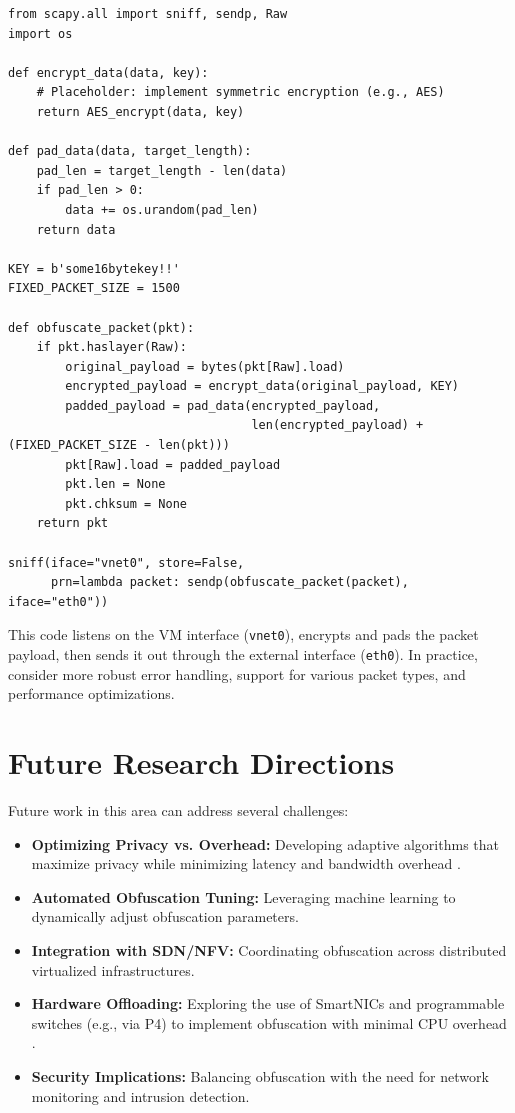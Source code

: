 \documentclass{article}
\begin{document}
\begin{verbatim}
from scapy.all import sniff, sendp, Raw
import os

def encrypt_data(data, key):
    # Placeholder: implement symmetric encryption (e.g., AES)
    return AES_encrypt(data, key)

def pad_data(data, target_length):
    pad_len = target_length - len(data)
    if pad_len > 0:
        data += os.urandom(pad_len)
    return data

KEY = b'some16bytekey!!'
FIXED_PACKET_SIZE = 1500

def obfuscate_packet(pkt):
    if pkt.haslayer(Raw):
        original_payload = bytes(pkt[Raw].load)
        encrypted_payload = encrypt_data(original_payload, KEY)
        padded_payload = pad_data(encrypted_payload, 
                                  len(encrypted_payload) + (FIXED_PACKET_SIZE - len(pkt)))
        pkt[Raw].load = padded_payload
        pkt.len = None
        pkt.chksum = None
    return pkt

sniff(iface="vnet0", store=False,
      prn=lambda packet: sendp(obfuscate_packet(packet), iface="eth0"))
\end{verbatim}

This code listens on the VM interface (\texttt{vnet0}), encrypts and pads the packet payload, then sends it out through the external interface (\texttt{eth0}). In practice, consider more robust error handling, support for various packet types, and performance optimizations.

\section{Future Research Directions}
Future work in this area can address several challenges:
\begin{itemize}[noitemsep]
    \item \textbf{Optimizing Privacy vs. Overhead:} Developing adaptive algorithms that maximize privacy while minimizing latency and bandwidth overhead \cite{futurePrivacy2022}.
    \item \textbf{Automated Obfuscation Tuning:} Leveraging machine learning to dynamically adjust obfuscation parameters.
    \item \textbf{Integration with SDN/NFV:} Coordinating obfuscation across distributed virtualized infrastructures.
    \item \textbf{Hardware Offloading:} Exploring the use of SmartNICs and programmable switches (e.g., via P4) to implement obfuscation with minimal CPU overhead \cite{ditto2021}.
    \item \textbf{Security Implications:} Balancing obfuscation with the need for network monitoring and intrusion detection.
\end{itemize}
\end{document}
